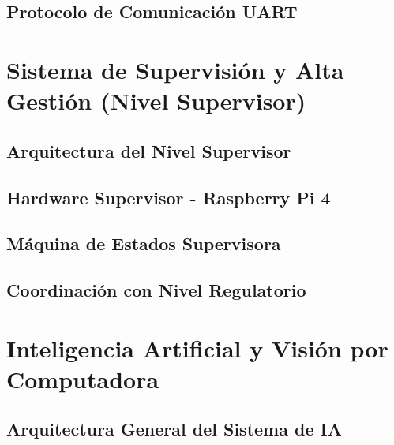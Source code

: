\documentclass[a4paper,12pt]{report}
\begin{document}
\subsection{Protocolo de Comunicación UART}



\section{Sistema de Supervisión y Alta Gestión (Nivel Supervisor)}

\subsection{Arquitectura del Nivel Supervisor}


\subsection{Hardware Supervisor - Raspberry Pi 4}



\subsection{Máquina de Estados Supervisora}




\subsection{Coordinación con Nivel Regulatorio}




\section{Inteligencia Artificial y Visión por Computadora}

\subsection{Arquitectura General del Sistema de IA}


\end{document}

